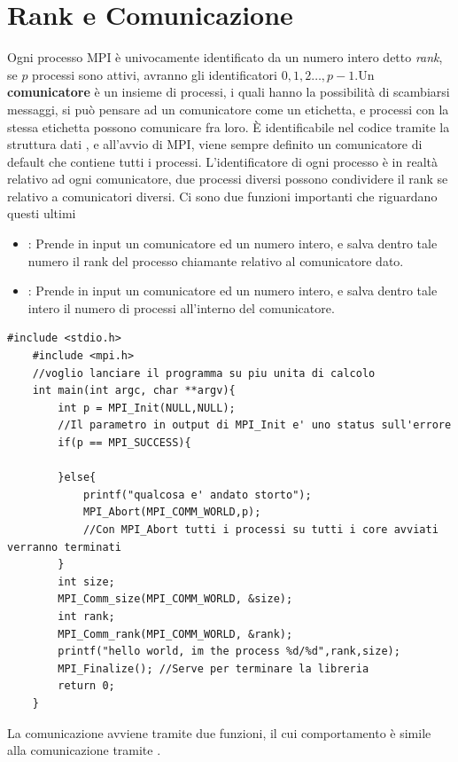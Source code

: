 \documentclass[10pt, letterpaper]{report}
\begin{document}
\section{Rank e Comunicazione}
Ogni processo MPI è univocamente identificato da un numero intero detto \textit{rank}, se $p$ processi sono 
attivi, avranno gli identificatori $0,1,2\dots,p-1$.\acc  Un \textbf{comunicatore} è un insieme di processi, i quali hanno 
la possibilità di scambiarsi messaggi, si può pensare ad un comunicatore come un etichetta, e processi con la stessa 
etichetta possono comunicare fra loro. 
È identificabile nel codice tramite la struttura dati , e all'avvio di MPI, viene sempre 
definito un comunicatore di default  che contiene tutti i processi.\acc 
L'identificatore di ogni processo è in realtà relativo ad ogni comunicatore, due processi diversi possono condividere il 
rank se relativo a comunicatori diversi. Ci sono due funzioni importanti che riguardano questi ultimi\begin{itemize}
    \item {} : Prende in input un comunicatore ed un numero intero, e 
    salva dentro tale numero il rank del processo chiamante relativo al comunicatore dato.
    \item {} : Prende in input un comunicatore ed un numero intero, e 
    salva dentro tale intero il numero di processi all'interno del comunicatore.
\end{itemize}
\begin{lstlisting}[style=CStyle]
    #include <stdio.h>
    #include <mpi.h>
    //voglio lanciare il programma su piu unita di calcolo
    int main(int argc, char **argv){
        int p = MPI_Init(NULL,NULL); 
        //Il parametro in output di MPI_Init e' uno status sull'errore
        if(p == MPI_SUCCESS){
        
        }else{
            printf("qualcosa e' andato storto");
            MPI_Abort(MPI_COMM_WORLD,p);
            //Con MPI_Abort tutti i processi su tutti i core avviati verranno terminati 
        }
        int size;
        MPI_Comm_size(MPI_COMM_WORLD, &size);
        int rank;
        MPI_Comm_rank(MPI_COMM_WORLD, &rank);
        printf("hello world, im the process %d/%d",rank,size);
        MPI_Finalize(); //Serve per terminare la libreria
        return 0;
    }
\end{lstlisting}
La comunicazione avviene tramite due funzioni, il cui comportamento è simile alla comunicazione tramite .\acc 
\end{document}
